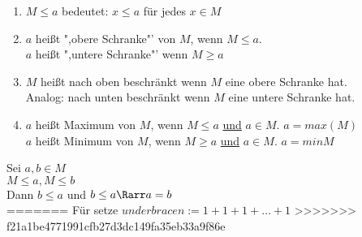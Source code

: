 	\begin{enumerate}
	\item{$M \leq a$ bedeutet: $x \leq a$ für jedes $x \in M$}
	\item{$a$ heißt ",obere Schranke"' von $M$, wenn $M \leq a$.\\
		$a$ heißt ",untere Schranke"' wenn $M \geq a$}
	\item{$M$ heißt nach oben beschränkt wenn $M$ eine obere Schranke hat.\\
	Analog: nach unten beschränkt wenn $M$ eine untere Schranke hat.}
	\item{$a$ heißt Maximum von $M$, wenn $M \leq a$ \underline{und} $a \in M$. $a = max(M)$\\
		$a$ heißt Minimum von $M$, wenn $M \geq a$ \underline{und} $a \in M$. $a = min{M}$}
	\end{enumerate}
\bew
	Sei $a, b \in M$\\
	$M \leq a, M \leq b$\\
	Dann $b \leq a$ und $b \leq a \Rarr a = b$\\
=======
	Für \nN{} setze $underbrace{n:= 1 + 1 + 1 + … + 1}$
>>>>>>> f21a1be4771991cfb27d3dc149fa35eb33a9f86e
	